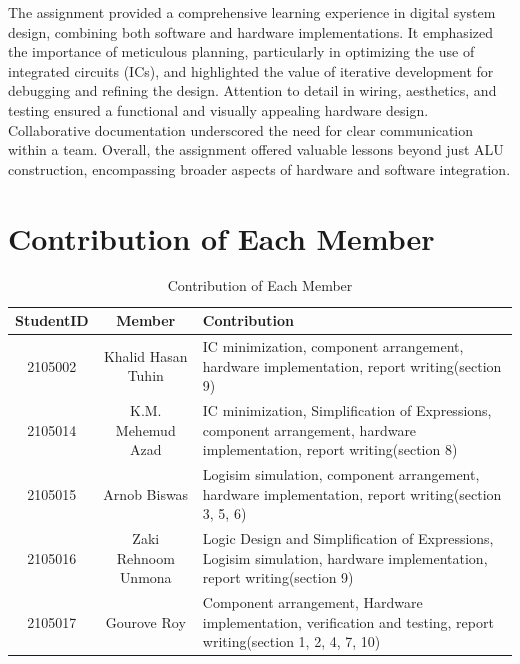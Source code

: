 \documentclass[11pt]{article}
\begin{document}
The assignment provided a comprehensive learning experience in digital system design, combining both software and hardware implementations. It emphasized the importance of meticulous planning, particularly in optimizing the use of integrated circuits (ICs), and highlighted the value of iterative development for debugging and refining the design. Attention to detail in wiring, aesthetics, and testing ensured a functional and visually appealing hardware design. Collaborative documentation underscored the need for clear communication within a team. Overall, the assignment offered valuable lessons beyond just ALU construction, encompassing broader aspects of hardware and software integration.
\section{Contribution of Each Member}
\begin{table}[ht]
    \centering
    \begin{tabular}{|c|c|p{8cm}|}
        \hline
        \textbf{StudentID} & \textbf{Member} & \textbf{Contribution} \\
        \hline
        2105002 & Khalid Hasan Tuhin & IC minimization, component arrangement, hardware implementation, report writing(section 9) \\
        \hline
        2105014 & K.M. Mehemud Azad & IC minimization, Simplification of Expressions, component arrangement, hardware implementation, report writing(section 8) \\
        \hline
        2105015 & Arnob Biswas & Logisim simulation, component arrangement, hardware implementation, report writing(section 3, 5, 6) \\
        \hline
        2105016 & Zaki Rehnoom Unmona & Logic Design and Simplification of Expressions, Logisim simulation, hardware implementation, report writing(section 9) \\
        \hline
        2105017 & Gourove Roy & Component arrangement, Hardware implementation, verification and testing, report writing(section 1, 2, 4, 7, 10) \\
        \hline
    \end{tabular}
    \caption{Contribution of Each Member}
\end{table}
\end{document}
